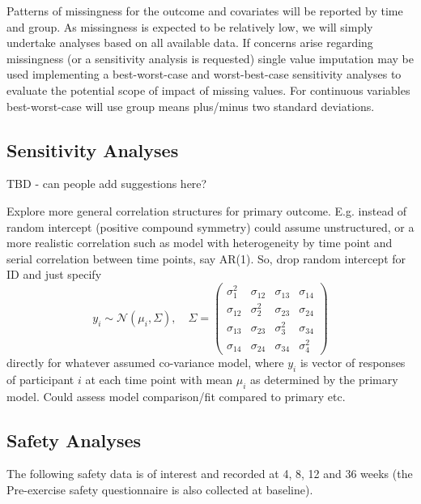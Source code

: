 \documentclass[
]{article}
\begin{document}
Patterns of missingness for the outcome and covariates will be reported by time and group.
As missingness is expected to be relatively low, we will simply undertake analyses based on all available data.
If concerns arise regarding missingness (or a sensitivity analysis is requested) single value imputation may be used implementing a best-worst-case and worst-best-case sensitivity analyses to evaluate the potential scope of impact of missing values.
For continuous variables best-worst-case will use group means plus/minus two standard deviations.

\hypertarget{sensitivity-analyses}{%
  \subsection{Sensitivity Analyses}\label{sensitivity-analyses}}

TBD - can people add suggestions here?

Explore more general correlation structures for primary outcome.
E.g. instead of random intercept (positive compound symmetry) could assume unstructured, or a more realistic correlation such as model with heterogeneity by time point and serial correlation between time points, say AR(1). So, drop random intercept for ID and just specify
$$
  y_i \sim \mathcal{N}(\mu_i, \Sigma),\quad
  \Sigma = \begin{pmatrix}
    \sigma_{1}^2 & \sigma_{12} & \sigma_{13} & \sigma_{14}  \\
    \sigma_{12}  & \sigma_2^2  & \sigma_{23} & \sigma_{24}  \\
    \sigma_{13}  & \sigma_{23} & \sigma_3^2  & \sigma_{34}  \\
    \sigma_{14}  & \sigma_{24} & \sigma_{34} & \sigma_{4}^2
  \end{pmatrix}
$$
directly for whatever assumed co-variance model, where $y_i$ is vector of responses of participant $i$ at each time point with mean $\mu_i$ as determined by the primary model. Could assess model comparison/fit compared to primary etc.

\hypertarget{safety-analyses}{%
  \subsection{Safety Analyses}\label{safety-analyses}}

The following safety data is of interest and recorded at 4, 8, 12 and 36 weeks (the Pre-exercise safety questionnaire is also collected at baseline).
\end{document}
